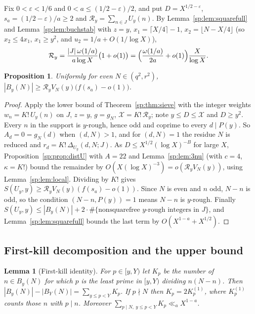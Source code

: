 \documentclass[final,11pt]{elsarticle}
\newtheorem{proposition}[theorem]{Proposition}
\newtheorem{lemma}[theorem]{Lemma}
\theoremstyle{definition}
\theoremstyle{remark}
\newcommand{\R}{\mathcal R}
\numberwithin{equation}{section}
\begin{document}
Fix $0<\varepsilon<1/6$ and $0<a\le(1/2-\varepsilon)/2$, and put
$D=X^{1/2-\varepsilon}$, $s_a=(1/2-\varepsilon)/a\ge2$ and
$\R_y=\sum_{n\in J}U_y(n)$. By Lemma~\ref{sp:lem:squarefull} and
Lemma~\ref{sp:lem:buchstab} with $z=y$, $x_1=\lceil X/4\rceil-1$,
$x_2=\lfloor N-X/4\rfloor$ (so $x_2\le4x_1$, $x_1\ge y^2$, and
$u_2=1/a+O(1/\log X)$),
\begin{equation}\label{sp:eq:R}
 \R_y=\frac{|J|\,\omega(1/a)}{a\log X}\bigl(1+o(1)\bigr)
 =\Bigl(\frac{\omega(1/a)}{2a}+o(1)\Bigr)\frac{X}{\log X}.
\end{equation}

\begin{proposition}\label{sp:prop:lower}
Uniformly for even $N\in(q^2,r^2)$, $|B_y(N)|\ge\R_yV_N(y)\bigl(f(s_a)-o(1)\bigr)$.
\end{proposition}

\begin{proof}
Apply the lower bound of Theorem~\ref{sp:thm:sieve} with the integer weights
$w_n=K!\,U_y(n)$ on $J$, $z=y$, $g=g_N$, $\mathcal X=K!\,\R_y$; note
$y\le D\le\mathcal X$ and $D\ge y^2$. Every $n$ in the support is $y$-rough, hence
odd and coprime to every $d\mid P(y)$. So $A_d=0=g_N(d)$ when $(d,N)>1$, and
for $(d,N)=1$ the residue $N$ is reduced and $r_d=K!\,\Delta_{U_y}(d,N;J)$. As
$D\le X^{1/2}(\log X)^{-B}$ for large $X$, Proposition~\ref{sp:prop:distU} with
$A=22$ and Lemma~\ref{sp:lem:3nu} (with $c=4$, $\kappa=K!$) bound the remainder
by $O(X(\log X)^{-3})=o(\R_yV_N(y))$, using Lemma~\ref{sp:lem:local}. Dividing by
$K!$ gives $S(U_y,y)\ge\R_yV_N(y)(f(s_a)-o(1))$. Since $N$ is even and $n$ odd, $N-n$ is
odd, so the condition $(N-n,P(y))=1$ means $N-n$ is $y$-rough. Finally
$S(U_y,y)\le|B_y(N)|+2\cdot\#\{\text{nonsquarefree $y$-rough integers in }J\}$,
and Lemma~\ref{sp:lem:squarefull} bounds the last term by $O(X^{1-a}+X^{1/2})$.
\end{proof}

\subsection{First-kill decomposition and the upper bound}\label{sp:sec:upper}

\begin{lemma}[First-kill identity]\label{sp:lem:firstkill}
For $p\in[y,Y)$ let $K_p$ be the number of $n\in B_y(N)$ for which $p$ is the
least prime in $[y,Y)$ dividing $n(N-n)$. Then
$|B_y(N)|-|B_Y(N)|=\sum_{y\le p<Y}K_p$. If $p\nmid N$ then $K_p=2K_p^{(1)}$, where
$K_p^{(1)}$ counts those $n$ with $p\mid n$. Moreover
$\sum_{p\mid N,\ y\le p<Y}K_p\ll_aX^{1-a}$.
\end{lemma}
\end{document}
